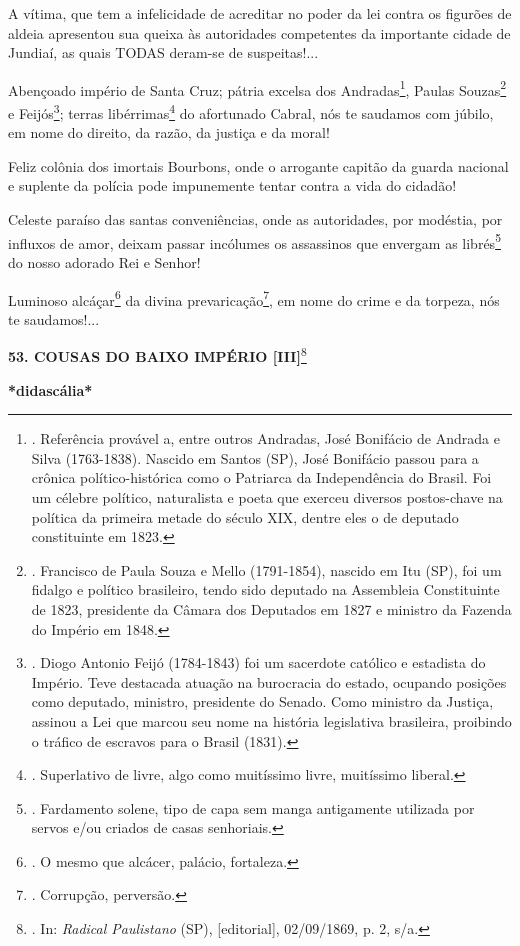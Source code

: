 A vítima, que tem a infelicidade de acreditar no poder da lei contra os
figurões de aldeia apresentou sua queixa às autoridades competentes da
importante cidade de Jundiaí, as quais TODAS deram-se de suspeitas!...

Abençoado império de Santa Cruz; pátria excelsa dos Andradas\footnote{.
  Referência provável a, entre outros Andradas, José Bonifácio de
  Andrada e Silva (1763-1838). Nascido em Santos (SP), José Bonifácio
  passou para a crônica político-histórica como o Patriarca da
  Independência do Brasil. Foi um célebre político, naturalista e poeta
  que exerceu diversos postos-chave na política da primeira metade do
  século XIX, dentre eles o de deputado constituinte em 1823.}, Paulas
Souzas\footnote{. Francisco de Paula Souza e Mello (1791-1854), nascido
  em Itu (SP), foi um fidalgo e político brasileiro, tendo sido deputado
  na Assembleia Constituinte de 1823, presidente da Câmara dos Deputados
  em 1827 e ministro da Fazenda do Império em 1848.} e
Feijós\footnote{. Diogo Antonio Feijó (1784-1843) foi um sacerdote
  católico e estadista do Império. Teve destacada atuação na burocracia
  do estado, ocupando posições como deputado, ministro, presidente do
  Senado. Como ministro da Justiça, assinou a Lei que marcou seu nome na
  história legislativa brasileira, proibindo o tráfico de escravos para
  o Brasil (1831).}; terras libérrimas\footnote{. Superlativo de livre,
  algo como muitíssimo livre, muitíssimo liberal.} do afortunado Cabral,
nós te saudamos com júbilo, em nome do direito, da razão, da justiça e
da moral!

Feliz colônia dos imortais Bourbons, onde o arrogante capitão da guarda
nacional e suplente da polícia pode impunemente tentar contra a vida do
cidadão!

Celeste paraíso das santas conveniências, onde as autoridades, por
modéstia, por influxos de amor, deixam passar incólumes os assassinos
que envergam as librés\footnote{. Fardamento solene, tipo de capa sem
  manga antigamente utilizada por servos e/ou criados de casas
  senhoriais.} do nosso adorado Rei e Senhor!

Luminoso alcáçar\footnote{. O mesmo que alcácer, palácio, fortaleza.} da
divina prevaricação\footnote{. Corrupção, perversão.}, em nome do crime
e da torpeza, nós te saudamos!...

\textbf{53. COUSAS DO BAIXO IMPÉRIO {[}III{]}}\footnote{. In:
  \emph{Radical Paulistano} (SP), {[}editorial{]}, 02/09/1869, p. 2,
  s/a.}

\textbf{*didascália*}

